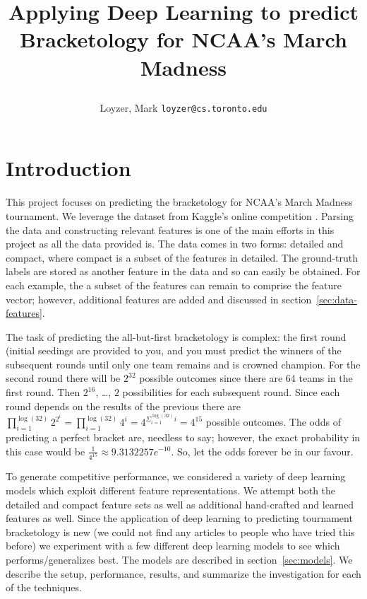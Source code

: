 \documentclass{article} %
\begin{document}
\title{Applying Deep Learning to predict Bracketology for NCAA's March Madness
\author{Loyzer, Mark \texttt{loyzer@cs.toronto.edu}}
}

\newcommand{\fix}{\marginpar{FIX}}
\newcommand{\new}{\marginpar{NEW}}


\maketitle

\section{Introduction}
This project focuses on predicting the bracketology for NCAA's March Madness tournament.  We leverage the dataset from Kaggle's online competition \citep{kagglecompetition}.  Parsing the data and constructing relevant features is one of the main efforts in this project as all the data provided is.  The data comes in two forms: detailed and compact, where compact is a subset of the features in detailed.  The ground-truth labels are stored as another feature in the data and so can easily be obtained.  For each example, the a subset of the features can remain to comprise the feature vector; however, additional features are added and discussed in section~\ref{sec:data-features}.


The task of predicting the all-but-first bracketology is complex: the first round (initial seedings are provided to you, and you must predict the winners of the subsequent rounds until only one team remains and is crowned champion.  For the second round there will be $2^{32}$ possible outcomes since there are 64 teams in the first round.  Then $2^{16}$, \dots, $2$ possibilities for each subsequent round.  Since each round depends on the results of the previous there are $\prod_{i=1}^{\log(32)} 2^{2^{i}} = \prod_{i=1}^{\log(32)} 4^{i} = 4^{\Sigma_{i=1}^{\log(32)} i} = 4^{15}$ possible outcomes.   The odds of predicting a perfect bracket are, needless to say; however, the exact probability in this case would be $\frac{1}{4^{15}} \approx 9.3132257e^{-10}$.  So, let the odds forever be in our favour.


To generate competitive performance, we considered a variety of deep learning models which exploit different feature representations.  We attempt both the detailed and compact feature sets as well as additional hand-crafted and learned features as well.  Since the application of deep learning to predicting tournament bracketology is new (we could not find any articles to people who have tried this before) we experiment with a few different deep learning models to see which performs/generalizes best.  The models are described in section~\ref{sec:models}.  We describe the setup, performance, results, and summarize the investigation for each of the techniques.
\end{document}
